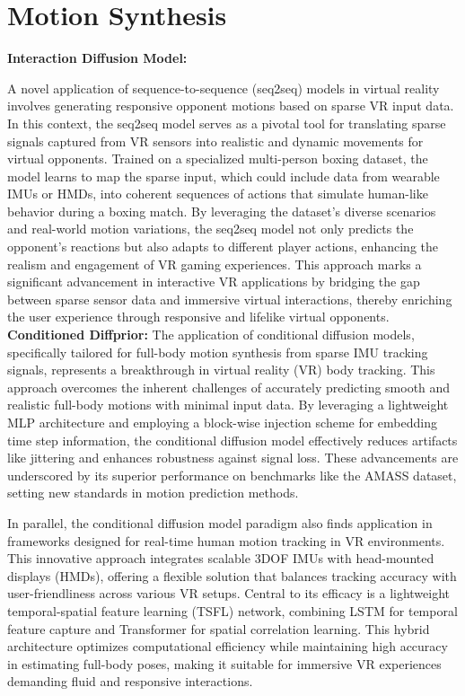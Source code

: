 \section{Motion Synthesis}
\textbf{Interaction Diffusion Model:}
 
A novel application of sequence-to-sequence (seq2seq) models in virtual reality involves generating responsive opponent motions based on sparse VR input data. In this context, the seq2seq model serves as a pivotal tool for translating sparse signals captured from VR sensors into realistic and dynamic movements for virtual opponents. Trained on a specialized multi-person boxing dataset, the model learns to map the sparse input, which could include data from wearable IMUs or HMDs, into coherent sequences of actions that simulate human-like behavior during a boxing match. By leveraging the dataset’s diverse scenarios and real-world motion variations, the seq2seq model not only predicts the opponent’s reactions but also adapts to different player actions, enhancing the realism and engagement of VR gaming experiences. This approach marks a significant advancement in interactive VR applications by bridging the gap between sparse sensor data and immersive virtual interactions, thereby enriching the user experience through responsive and lifelike virtual opponents.
\textbf{Conditioned Diffprior:}
The application of conditional diffusion models, specifically tailored for full-body motion synthesis from sparse IMU tracking signals, represents a breakthrough in virtual reality (VR) body tracking. This approach overcomes the inherent challenges of accurately predicting smooth and realistic full-body motions with minimal input data. By leveraging a lightweight MLP architecture and employing a block-wise injection scheme for embedding time step information, the conditional diffusion model effectively reduces artifacts like jittering and enhances robustness against signal loss. These advancements are underscored by its superior performance on benchmarks like the AMASS dataset, setting new standards in motion prediction methods.

In parallel, the conditional diffusion model paradigm also finds application in frameworks designed for real-time human motion tracking in VR environments. This innovative approach integrates scalable 3DOF IMUs with head-mounted displays (HMDs), offering a flexible solution that balances tracking accuracy with user-friendliness across various VR setups. Central to its efficacy is a lightweight temporal-spatial feature learning (TSFL) network, combining LSTM for temporal feature capture and Transformer for spatial correlation learning. This hybrid architecture optimizes computational efficiency while maintaining high accuracy in estimating full-body poses, making it suitable for immersive VR experiences demanding fluid and responsive interactions.

